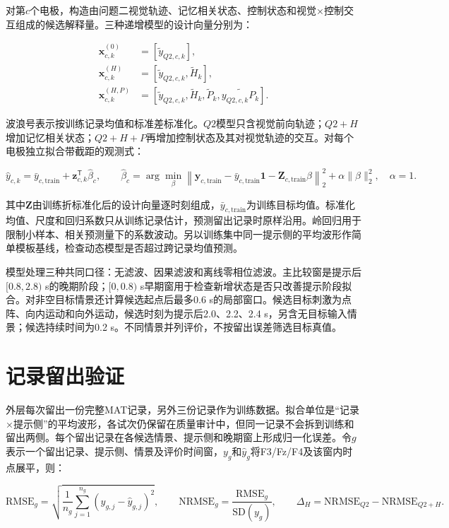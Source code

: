对第\(c\)个电极，构造由问题二视觉轨迹、记忆相关状态、控制状态和视觉×控制交互组成的候选解释量。三种递增模型的设计向量分别为：

\[
\begin{aligned}
\mathbf x_{c,k}^{(0)}&=[\tilde y_{Q2,c,k}],\\
\mathbf x_{c,k}^{(H)}&=[\tilde y_{Q2,c,k},\tilde H_k],\\
\mathbf x_{c,k}^{(H,P)}&=[\tilde y_{Q2,c,k},\tilde H_k,\tilde P_k,\widetilde{y_{Q2,c,k}P_k}].
\end{aligned}
\]

波浪号表示按训练记录均值和标准差标准化。\(Q2\)模型只含视觉前向轨迹；\(Q2+H\)增加记忆相关状态；\(Q2+H+P\)再增加控制状态及其对视觉轨迹的交互。对每个电极独立拟合带截距的观测式：

\[
\hat y_{c,k}=\bar y_{c,\mathrm{train}}+\mathbf z_{c,k}^{\mathsf T}\hat\beta_c,
\qquad
\hat\beta_c=\arg\min_{\beta}\left\|\mathbf y_{c,\mathrm{train}}-\bar y_{c,\mathrm{train}}\mathbf 1-\mathbf Z_{c,\mathrm{train}}\beta\right\|_2^2+\alpha\|\beta\|_2^2,
\quad \alpha=1.
\]

其中\(\mathbf Z\)由训练折标准化后的设计向量逐时刻组成，\(\bar y_{c,\mathrm{train}}\)为训练目标均值。标准化均值、尺度和回归系数只从训练记录估计，预测留出记录时原样沿用。岭回归用于限制小样本、相关预测量下的系数波动\cite{hoerlKennard1970}。另以训练集中同一提示侧的平均波形作简单模板基线，检查动态模型是否超过跨记录均值预测。

模型处理三种共同口径：无滤波、因果滤波和离线零相位滤波。主比较窗是提示后\([0.8,2.8)\) s的晚期阶段；\([0,0.8)\) s早期窗用于检查新增状态是否只改善提示阶段拟合。对非空目标情景还计算候选起点后最多0.6 s的局部窗口。候选目标刺激为点阵、向内运动和向外运动，候选时刻为提示后2.0、2.2、2.4 s，另含无目标输入情景；候选持续时间为0.2 s。不同情景并列评价，不按留出误差筛选目标真值。

\hypertarget{ux8bb0ux5f55ux7559ux51faux9a8cux8bc1}{%
\section{记录留出验证}\label{ux8bb0ux5f55ux7559ux51faux9a8cux8bc1}}

外层每次留出一份完整MAT记录，另外三份记录作为训练数据。拟合单位是``记录×提示侧''的平均波形，各试次仍保留在质量审计中，但同一记录不会拆到训练和留出两侧。每个留出记录在各候选情景、提示侧和晚期窗上形成归一化误差。令\(g\)表示一个留出记录、提示侧、情景及评价时间窗，\(y_g\)和\(\hat y_g\)将F3/Fz/F4及该窗内时点展平，则：

\[
\mathrm{RMSE}_g=\sqrt{\frac{1}{n_g}\sum_{j=1}^{n_g}(y_{g,j}-\hat y_{g,j})^2},\qquad
\mathrm{NRMSE}_g=\frac{\mathrm{RMSE}_g}{\mathrm{SD}(y_g)},\qquad
\Delta_H=\mathrm{NRMSE}_{Q2}-\mathrm{NRMSE}_{Q2+H}.
\]

